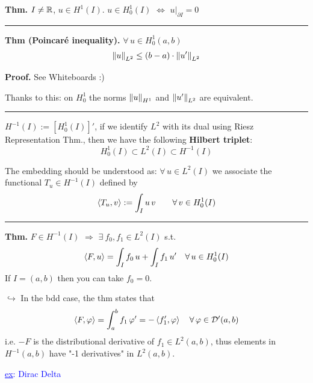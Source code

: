 \smallskip

\textbf{Thm.} $I\neq\mathbb{R}$, $u\in H^1(I)$. $u\in H^1_0(I)$ $\Leftrightarrow$ $u\big|_{\partial I}=0$

\rule{0.31\textwidth}{0.2pt}
\smallskip

\textbf{Thm (Poincaré inequality).} $\forall\, u\in H^1_0(a,b)$
\begin{equation*}
\left\lVert u \right\rVert_{L^2}\leq (b-a)\cdot \left\lVert u' \right\rVert_{L^2}
\end{equation*}

\textbf{Proof.} See Whiteboards :)

\smallskip

Thanks to this: on $H^1_0$ the norms $\left\lVert u \right\rVert_{H^1}$ and $\left\lVert u' \right\rVert_{L^2}$ are equivalent.

\rule{0.31\textwidth}{0.2pt}
\smallskip

$H^{-1}(I):=\left[ H^1_0(I) \right]'$, if we identify $L^2$ with its dual using Riesz Representation Thm., then we have the following \textbf{Hilbert triplet}:
\begin{equation*}
H_0^1(I)\subset L^2(I) \subset H^{-1}(I)
\end{equation*}

The embedding should be understood as: $\forall\, u\in L^2(I)$ we associate the functional $T_u\in H^{-1}(I)$ defined by
\begin{equation*}
\left\langle T_u,v \right\rangle:=\int_I u\,v\qquad \forall\, v\in H^1_0(I)
\end{equation*}

\rule{0.31\textwidth}{0.2pt}
\smallskip

\textbf{Thm.} $F\in H^{-1}(I)$ $\Rightarrow$ $\exists\ f_0,f_1\in L^2(I)$ s.t.
\begin{equation*}
\left\langle F,u \right\rangle=\int_I f_0\,u+\int_I f_1\,u'\quad\forall\,u\in H^1_0(I)
\end{equation*}
If $I=(a,b)$ then you can take $f_0=0$.

\medskip

$\hookrightarrow$ In the bdd case, the thm  states that 
\begin{equation*}
\left\langle F,\varphi \right\rangle=\int_a^b f_1\,\varphi'=-\left\langle f_1',\varphi \right\rangle\quad \forall\, \varphi\in\mathcal{D}'(a,b)
\end{equation*}
i.e. $-F$ is the distributional derivative of $f_1\in L^2(a,b)$, thus elements in $H^{-1}(a,b)$ have "-1 derivatives" in $L^2(a,b)$.

\smallskip

\textcolor{blue}{\underline{ex}: Dirac Delta}

